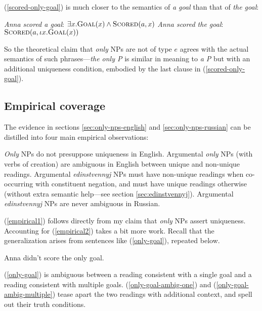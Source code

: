 (\ref{scored-only-goal}) is much closer to the semantics of \textit{a goal} than that of \textit{the goal}:

\begin{exe}
	\ex \label{a-goal} \textit{Anna scored a goal}: $\exists x . \textsc{Goal}(x) \land \textsc{Scored}(a, x)$
	\ex \label{the-goal} \textit{Anna scored the goal}: $\textsc{Scored}(a, \iota x . \textsc{Goal}(x))$
\end{exe}

So the theoretical claim that \textit{only} NPs are not of type $e$ agrees with the actual semantics of such phrases---\textit{the only P} is similar in meaning to \textit{a P} but with an additional uniqueness condition, embodied by the last clause in (\ref{scored-only-goal}).

\subsection{Empirical coverage}
The evidence in sections \ref{sec:only-nps-english} and \ref{sec:only-nps-russian} can be distilled into four main empirical observations:

\begin{exe}
	\ex \label{empirical1} \textit{Only} NPs do not presuppose uniqueness in English.
	\ex \label{empirical2} Argumental \textit{only} NPs (with verbs of creation) are ambiguous in English between unique and non-unique readings.
	\ex \label{empirical3} Argumental \textit{edinstvennyj} NPs must have non-unique readings when co-occurring with constituent negation, and must have unique readings otherwise (without extra semantic help---see section \ref{sec:edinstvennyj}).
	\ex \label{empirical4} Argumental \textit{edinstvennyj} NPs are never ambiguous in Russian.
\end{exe}

(\ref{empirical1}) follows directly from my claim that \textit{only} NPs assert uniqueness. Accounting for (\ref{empirical2}) takes a bit more work. Recall that the generalization arises from sentences like (\ref{only-goal}), repeated below.

\begin{exe}
	 Anna didn't score the only goal.
\end{exe}

(\ref{only-goal}) is ambiguous between a reading consistent with a single goal and a reading consistent with multiple goals. (\ref{only-goal-ambig-one}) and (\ref{only-goal-ambig-multiple}) tease apart the two readings with additional context, and spell out their truth conditions.

